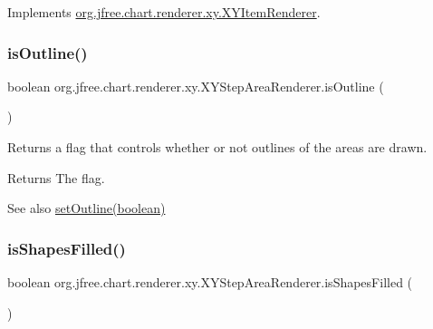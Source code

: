 Implements \mbox{\hyperlink{interfaceorg_1_1jfree_1_1chart_1_1renderer_1_1xy_1_1_x_y_item_renderer_ad3313de1104e462f8299b58ce9901cfb}{org.\+jfree.\+chart.\+renderer.\+xy.\+X\+Y\+Item\+Renderer}}.

\mbox{\label{classorg_1_1jfree_1_1chart_1_1renderer_1_1xy_1_1_x_y_step_area_renderer_a4ac2c45076adb6af5706071393a11008}} 
\subsubsection{\texorpdfstring{is\+Outline()}{isOutline()}}
{\footnotesize\ttfamily boolean org.\+jfree.\+chart.\+renderer.\+xy.\+X\+Y\+Step\+Area\+Renderer.\+is\+Outline (\begin{DoxyParamCaption}{ }\end{DoxyParamCaption})}

Returns a flag that controls whether or not outlines of the areas are drawn.

\begin{DoxyReturn}{Returns}
The flag.
\end{DoxyReturn}
\begin{DoxySeeAlso}{See also}
\mbox{\hyperlink{classorg_1_1jfree_1_1chart_1_1renderer_1_1xy_1_1_x_y_step_area_renderer_a064e1b7e72aeda06821847fa34c98ff0}{set\+Outline(boolean)}} 
\end{DoxySeeAlso}
\mbox{\label{classorg_1_1jfree_1_1chart_1_1renderer_1_1xy_1_1_x_y_step_area_renderer_aa4918ed44e42b921f005daf48d3fe2c8}} 
\subsubsection{\texorpdfstring{is\+Shapes\+Filled()}{isShapesFilled()}}
{\footnotesize\ttfamily boolean org.\+jfree.\+chart.\+renderer.\+xy.\+X\+Y\+Step\+Area\+Renderer.\+is\+Shapes\+Filled (\begin{DoxyParamCaption}{ }\end{DoxyParamCaption})}


